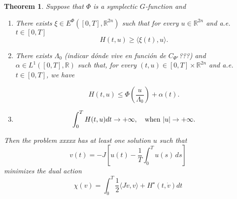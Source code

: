 \documentclass[twoside]{article}
\makeatletter
\newtheorem{thm}{Theorem}[section]
\theoremstyle{remark}
\newcommand{\labitem}[2]{%
\def\@itemlabel{#1}
\item
\def\@currentlabel{#1}\label{#2}}
\newcommand{\rr}{\mathbb{R}}
\renewcommand{\leq}{\leqslant}
\renewcommand{\geq}{\geqslant}
\makeatother
\begin{document}
\begin{thm}\label{thm:solution-ham} Suppose that $\Phi$ is a symplectic $G$-function and
\begin{enumerate}
 \labitem{H1)}{it:hip1}   There exists $\xi\in E^{\Phi}([0,T],\rr^{2n})$ such that for every $u \in \rr^{2n}$ 
and a.e. $t \in [0,T]$
 \[H(t,u)\geq \langle \xi(t), u\rangle.
  \]
	
 \labitem{H2)}{it:hip2} There exists $\Lambda_0$ \textcolor[rgb]{1,0,0}{(indicar d\'onde vive en funci\'on de $C_{\Phi^{\star}}$???)} 
and $\alpha \in L^1([0,T],\rr) $
such that, for every $(t,u)\in [0,T]\times\rr^{2n}$ and a.e. $t \in [0,T]$, we have

 \[
  H(t,u)\leq \Phi\left( \frac{u}{\Lambda_0}\right)+\alpha(t).
 \]
 \labitem{H3)}{it:hip3} 
 \[
  \int_0^TH(t,u)dt\to+\infty,\quad\hbox{when } |u|\to+\infty.
 \]

\end{enumerate}

Then the problem xxxxx has at least one solution $u$ such that 
\[
v(t)=-J\left[u(t)-\frac{1}{T}\int_0^T u(s)\,ds\right]
\]
minimizes the dual action
\[
\chi(v)= \int_0^T \frac{1}{2} \langle J\dot{v},v\rangle+H^{\star}(t,\dot{v})  dt
\]

\end{thm}
\end{document}
